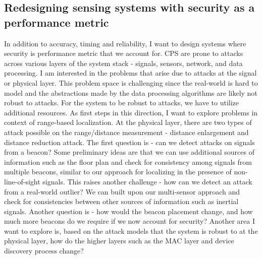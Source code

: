 \documentclass[10pt]{article}
\begin{document}
\subsection{Redesigning sensing systems with security as a performance metric}
In addition to accuracy, timing and reliability, I want to design systems where security is performance metric that we account for. CPS are prone to attacks across various layers of the system stack - signals, sensors, network, and data processing. I am interested in the problems that arise due to attacks at the signal or physical layer. This problem space is challenging since the real-world is hard to model and the abstractions made by the data processing algorithms are likely not robust to attacks. For the system to be robust to attacks, we have to utilize additional resources. %
As first steps in this direction, I want to explore problems in context of range-based localization. At the physical layer, there are two types of attack possible on the range/distance measurement - distance enlargement and distance reduction attack. The first question is - can we detect attacks on signals from a beacon? Some preliminary ideas are that we can use additional sources of information  such as the floor plan and check for consistency among signals from multiple beacons, similar to our approach for localizing in the presence of non-line-of-sight signals. This raises another challenge - how can we detect an attack from a real-world outlier? We can built upon our multi-sensor approach and check for consistencies between other sources of information such as inertial signals. Another question is - how would the beacon placement change, and how much more beacons do we require if we now account for security? Another area I want to explore is, based on the attack models that the system is robust to at the physical layer, how do the higher layers such as the MAC layer and device discovery process change? %
\end{document}
